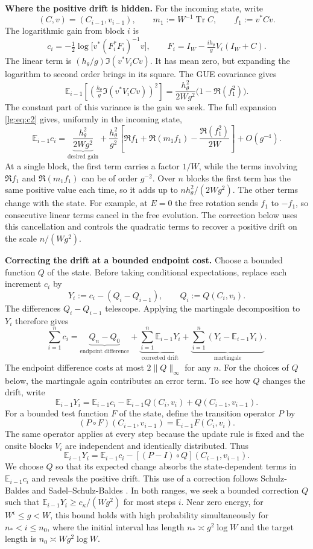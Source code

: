 \documentclass[11pt]{article}
\numberwithin{equation}{section}
\theoremstyle{remark}
\newcommand{\E}{\mathbb E}
\newcommand{\Tr}{\operatorname{Tr}}
\begin{document}
\medskip\noindent\textbf{Where the positive drift is hidden.}
For the incoming state, write
\[
 (C,v)=(C_{i-1},v_{i-1}),\qquad
 m_1:=W^{-1}\Tr C,\qquad f_1:=v^*Cv.
\]
The logarithmic gain from block $i$ is
\[
 c_i=-\tfrac12\log\bigl[v^*(F_i^*F_i)^{-1}v\bigr],\qquad
 F_i=I_W-\tfrac{ih_\theta}{g}V_i(I_W+C).
\]
The linear term is $(h_\theta/g)\Im(v^*V_iCv)$. It has mean zero,
but expanding the logarithm to second order brings in its square.
The GUE covariance gives
\[
 \E_{i-1}\!\left[\left(\tfrac{h_\theta}{g}\Im(v^*V_iCv)\right)^2\right]
 =\frac{h_\theta^2}{2Wg^2}\bigl(1-\Re(f_1^2)\bigr).
\]
The constant part of this variance is the gain we seek.
The full expansion \eqref{lg:eq:c2} gives,
uniformly in the incoming state,
\[
 \E_{i-1}c_i
 =\underbrace{\frac{h_\theta^2}{2Wg^2}}_{\text{desired gain}}
 +\frac{h_\theta^2}{g^2}
 \left[\Re f_1+\Re(m_1f_1)-\frac{\Re(f_1^2)}{2W}\right]+O(g^{-4}).
\]
At a single block, the first term carries a factor $1/W$, while the
terms involving $\Re f_1$ and $\Re(m_1f_1)$ can be of order $g^{-2}$.
Over $n$ blocks the first term has the same positive value each time,
so it adds up to $nh_\theta^2/(2Wg^2)$. The other terms change with
the state. For example, at $E=0$ the free rotation sends $f_1$ to
$-f_1$, so consecutive linear terms cancel in the free evolution.
The correction below uses this cancellation and controls the quadratic
terms to recover a positive drift on the scale $n/(Wg^2)$.

\medskip\noindent\textbf{Correcting the drift at a bounded endpoint cost.}
Choose a bounded function $Q$ of the state. Before taking conditional
expectations, replace each increment $c_i$ by
\[
 Y_i:=c_i-(Q_i-Q_{i-1}),\qquad Q_i:=Q(C_i,v_i).
\]
The differences $Q_i-Q_{i-1}$ telescope. Applying the martingale
decomposition to $Y_i$ therefore gives
\[
 \sum_{i=1}^n c_i
 =\underbrace{Q_n-Q_0}_{\text{endpoint difference}}
 +\underbrace{\sum_{i=1}^n\E_{i-1}Y_i}_{\text{corrected drift}}
 +\underbrace{\sum_{i=1}^n(Y_i-\E_{i-1}Y_i)}_{\text{martingale}}.
\]
The endpoint difference costs at most $2\|Q\|_\infty$ for any $n$.
For the choices of $Q$ below, the martingale again contributes an error term.
To see how $Q$ changes the drift, write
\[
 \E_{i-1}Y_i=\E_{i-1}c_i-\E_{i-1}Q(C_i,v_i)+Q(C_{i-1},v_{i-1}).
\]
For a bounded test function $F$ of the state, define the transition
operator $P$ by
\[
 (P\circ F)(C_{i-1},v_{i-1})=\E_{i-1}F(C_i,v_i).
\]
The same operator applies at every step because the update rule is fixed
and the onsite blocks $V_i$ are independent and identically distributed.
Thus
\[
 \E_{i-1}Y_i=\E_{i-1}c_i-[(P-I)\circ Q](C_{i-1},v_{i-1}).
\]
We choose $Q$ so that its expected change absorbs the state-dependent
terms in $\E_{i-1}c_i$ and reveals the positive drift.
This use of a correction follows
Schulz-Baldes \cite[Lemma~1 and Section~6.1]{SBanomaly} and
Sadel--Schulz-Baldes \cite[Sections~3--5]{SSB}.
In both ranges, we seek a bounded correction $Q$ such that
$\E_{i-1}Y_i\ge c_\kappa/(Wg^2)$ for most steps $i$.
Near zero energy, for $W^\epsilon\le g<W$, this bound holds with high
probability simultaneously for $n_*<i\le n_0$, where the initial
interval has length $n_*\asymp g^2\log W$ and the target length is
$n_0\asymp Wg^2\log W$.
\end{document}
